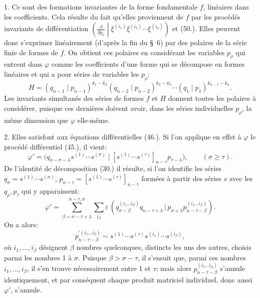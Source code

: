 \documentclass[11pt]{article}
\newcommand{\pair}[2]{(#1\,|\,#2)}
\newcommand{\eps}{\varepsilon}
\begin{document}
1. Ce sont des formations invariantes de la forme fondamentale $f$, linéaires dans les coefficients. Cela résulte du fait qu'elles proviennent de $f$ par les procédés invariants de différentiation $\left(\frac{\partial}{\partial p_\rho}\middle|\xi^{(i_1)}\xi^{(i_2)}\cdots\xi^{(i_\rho)}\right)$ et (50.). Elles peuvent donc s'exprimer linéairement (d'après la fin du \S\ 6) par des polaires de la série finie de formes de $f$. On obtient ces polaires en considérant les variables $p_\rho$ qui entrent dans $\varphi$ comme les coefficients d'une forme qui se décompose en formes linéaires et qui a pour séries de variables les $p_\rho$:
\begin{equation}
 H=(q_{n-1}\mid p_{n-1})^{k_1-k_2}(q_{n-2}\mid p_{n-2})^{k_2-k_3}\cdots(q_1\mid p_1)^{k_{n-1}-k_n}.
\tag{52}
\end{equation}
Les invariants simultanés des séries de formes $f$ et $H$ donnent toutes les polaires à considérer, puisque ces dernières doivent avoir, dans les séries individuelles $p_\rho$, la même dimension que $\varphi$ elle-même.

2. Elles satisfont aux équations différentielles (46.). Si l'on applique en effet à $\varphi$ le procédé différentiel (45.), il vient:
\[
 \varphi'=\bigl(q_{n-\sigma-\lambda}s^{(1)}\cdots s^{(\sigma)}\mid [s^{(1)}\cdots s^{(\tau)}]_{n-\tau}p_{\tau-\lambda}\bigr),\qquad (\sigma\ge\tau).
\]
De l'identité de décomposition (30.) il résulte, si l'on identifie les séries $q_\sigma=s^{(1)}\cdots s^{(\sigma)}$, $p_{n-\tau}=[s^{(1)}\cdots s^{(\tau)}]_{n-\tau}$ formées à partir des séries $s$ avec les $q_\rho,p_\tau$ qui y apparaissent:
\[
 \varphi'=\sum_{\beta=\sigma-\tau+\lambda}^{n-\tau,\sigma}\sum_{i_\beta}\eps\,
 \pair{q_{\sigma-\beta}^{(i_1\ldots i_\beta)}q_{n-\tau+\lambda}}{p_{\sigma+\lambda}p_{n-\tau-\beta}^{(i_1\ldots i_\beta)}}.
\]
On a alors:
\[
 p_{n-\tau-\beta}^{\prime(i_1\ldots i_\beta)}\sim s^{(1)}\cdots s^{(\tau)}s^{(i_1)}\cdots s^{(i_\beta)},
\]
où $i_1,\ldots,i_\beta$ désignent $\beta$ nombres quelconques, distincts les uns des autres, choisis parmi les nombres 1 à $\sigma$. Puisque $\beta>\sigma-\tau$, il s'ensuit que, parmi ces nombres $i_1,\ldots,i_\beta$, il s'en trouve nécessairement entre 1 et $\tau$; mais alors $p_{n-\tau-\beta}^{(i_1\ldots i_\beta)}$ s'annule identiquement, et par conséquent chaque produit matriciel individuel, donc aussi $\varphi'$, s'annule.
\end{document}
